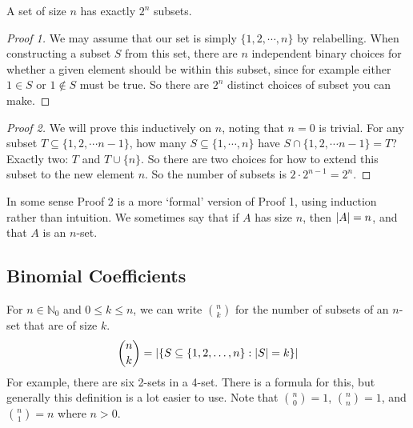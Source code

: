\begin{proposition}
	A set of size \(n\) has exactly \(2^n\) subsets.
\end{proposition}
\begin{proof}[Proof 1]
	We may assume that our set is simply \(\{ 1, 2, \cdots, n \}\) by relabelling.
	When constructing a subset \(S\) from this set, there are \(n\) independent binary choices for whether a given element should be within this subset, since for example either \(1 \in S\) or \(1 \notin S\) must be true.
	So there are \(2^n\) distinct choices of subset you can make.
\end{proof}
\begin{proof}[Proof 2]
	We will prove this inductively on \(n\), noting that \(n=0\) is trivial.
	For any subset \(T \subseteq \{ 1, 2, \cdots n-1 \}\), how many \(S \subseteq \{ 1, \cdots, n \}\) have \(S \cap \{ 1, 2, \cdots n-1 \} = T\)?
	Exactly two: \(T\) and \(T \cup \{ n \}\).
	So there are two choices for how to extend this subset to the new element \(n\).
	So the number of subsets is \(2 \cdot 2^{n-1} = 2^n\).
\end{proof}
\noindent In some sense Proof 2 is a more `formal' version of Proof 1, using induction rather than intuition.
We sometimes say that if \(A\) has size \(n\), then \(\abs{A} = n\), and that \(A\) is an \(n\)-set.

\subsection{Binomial Coefficients}
For \(n \in \mathbb N_0\) and \(0 \leq k \leq n\), we can write \(\binom{n}{k}\) for the number of subsets of an \(n\)-set that are of size \(k\).
\[
	\binom{n}{k} = \abs{\left\{ S \subseteq \{ 1, 2, \dots, n \}: \abs{S} = k \right\}}
\]
For example, there are six 2-sets in a 4-set.
There is a formula for this, but generally this definition is a lot easier to use.
Note that \(\binom{n}{0} = 1\), \(\binom{n}{n} = 1\), and \(\binom{n}{1}=n\) where \(n>0\).


